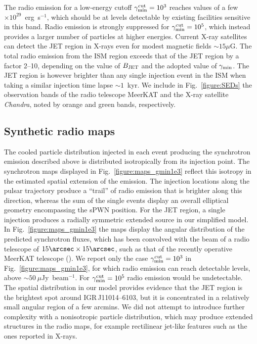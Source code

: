 \documentclass[letter]{aa}
\newcommand{\IGR}{IGR\,J11014--6103}
\begin{document}
The radio emission for a low-energy cutoff $\gamma_{\rm min}^{ \rm cut} = 10^3$ reaches values of a few $\times 10^{29}$~erg~s$^{-1}$, which should be at levels detectable by existing facilities sensitive in this band. Radio emission is strongly suppressed for $\gamma_{\rm min}^{ \rm cut} = 10^5$, which instead provides a larger number of particles at higher energies. Current X-ray satellites can detect the JET region in X-rays even for modest magnetic fields $\sim 15 \mu$G. The total radio emission from the ISM region exceeds that of the JET region by a factor 2--10, depending on the value of $B_{\rm JET}$ and the adopted value of $\gamma_{\rm min}$. The JET region is however brighter than any single injection event in the ISM when taking a similar injection time lapse $\sim 1$~kyr. We include in Fig.~\ref{figure:SEDs} the observation bands of the radio telescope MeerKAT and the X-ray satellite \textit{Chandra}, noted by orange and green bands, respectively.


\subsection{Synthetic radio maps}

The cooled particle distribution injected in each event producing the synchrotron emission described above is distributed isotropically from its injection point. The synchrotron maps displayed in Fig.~\ref{figure:maps_gmin1e3} reflect this isotropy in the estimated spatial extension of the emission. The injection locations along the pulsar trajectory produce a ``trail'' of radio emission that is brighter along this direction, whereas the sum of the single events display an overall elliptical geometry encompassing the sPWN position. For the JET region, a single injection produces a radially symmetric extended source in our simplified model. In Fig.~\ref{figure:maps_gmin1e3} the maps display the angular distribution of the predicted synchrotron fluxes, which has been convolved with the beam of a radio telescope of $15\arcsec \times 15\arcsec$, such as that of the recently operative MeerKAT telescope (\citealp{Jonas2016}). We report only the case $\gamma_{\rm min}^{ \rm cut} = 10^3$ in Fig.~\ref{figure:maps_gmin1e3}, for which radio emission can reach detectable levels, above $\sim 50~ \mu$Jy~beam$^{-1}$. For $\gamma_{\rm min}^{ \rm cut} = 10^5$ radio emission would be undetectable. The spatial distribution in our model provides evidence that the JET region is the brightest spot around \IGR, but it is concentrated in a relatively small angular region of a few arcmins. We did not attempt to introduce further complexity with a nonisotropic particle distribution, which may produce extended structures in the radio maps, for example rectilinear jet-like features such as the ones reported in X-rays.
\end{document}
